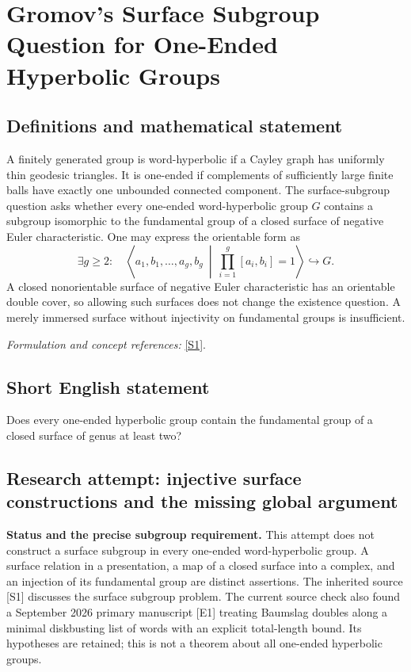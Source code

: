 \documentclass[11pt]{article}
\begin{document}
\section*{\texorpdfstring{Gromov's Surface Subgroup Question for One-Ended Hyperbolic Groups}{Gromov's Surface Subgroup Question for One-Ended Hyperbolic Groups}}\label{statement}
\subsection{Definitions and mathematical statement}
A finitely generated group is word-hyperbolic if a Cayley graph has uniformly thin geodesic triangles. It is one-ended if complements of sufficiently large finite balls have exactly one unbounded connected component. The surface-subgroup question asks whether every one-ended word-hyperbolic group $G$ contains a subgroup isomorphic to the fundamental group of a closed surface of negative Euler characteristic. One may express the orientable form as
\[
 \exists g\ge2:\quad
 \left\langle a_1,b_1,\ldots,a_g,b_g\ \middle|\
 \prod_{i=1}^g[a_i,b_i]=1\right\rangle\hookrightarrow G.
\]
A closed nonorientable surface of negative Euler characteristic has an orientable double cover, so allowing such surfaces does not change the existence question. A merely immersed surface without injectivity on fundamental groups is insufficient.
\par\smallskip\textit{Formulation and concept references:} \href{https://research-repository.st-andrews.ac.uk/bitstream/handle/10023/26667/Gardam_2022_MRL_SGC_AAM.pdf?sequence=1}{[S1]}.

\subsection{Short English statement}
Does every one-ended hyperbolic group contain the fundamental group of a closed surface of genus at least two?
\subsection{Research attempt: injective surface constructions and the missing global argument}
\textbf{Status and the precise subgroup requirement.} This attempt does not construct a surface subgroup in every one-ended word-hyperbolic group. A surface relation in a presentation, a map of a closed surface into a complex, and an injection of its fundamental group are distinct assertions. The inherited source [S1] discusses the surface subgroup problem. The current source check also found a September 2026 primary manuscript [E1] treating Baumslag doubles along a minimal diskbusting list of words with an explicit total-length bound. Its hypotheses are retained; this is not a theorem about all one-ended hyperbolic groups.
\end{document}
